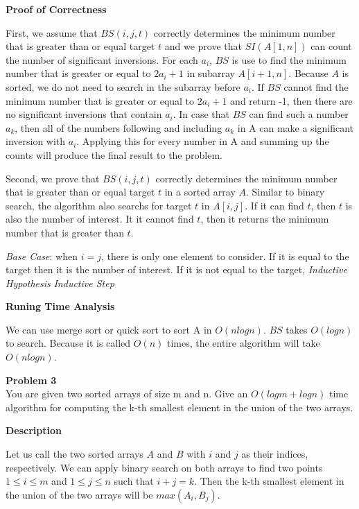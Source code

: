 \documentclass[12pt,article]{article}
\newenvironment{problem}[2][Problem]
    { \begin{mdframed}[backgroundcolor=gray!20] \textbf{#1 #2} \\}
    {  \end{mdframed}}
\begin{document}
\textbf{Proof of Correctness}

First, we assume that $BS(i,j,t)$ correctly determines the minimum number that is greater than or equal target $t$ and we prove that $SI(A[1,n])$ can count the number of significant inversions. For each $a_i$, $BS$ is use to find the minimum number that is greater or equal to $2a_i + 1$ in subarray $A[i+1,n]$. Because $A$ is sorted, we do not need to search in the subarray before $a_i$. If $BS$ cannot find the minimum number that is greater or equal to $2a_i + 1$ and return -1, then there are no significant inversions that contain $a_i$. In case that $BS$ can find such a number $a_k$, then all of the numbers following and including $a_k$ in A can make a significant inversion with $a_i$. Applying this for every number in A and summing up the counts will produce the final result to the problem.

Second, we prove that $BS(i,j,t)$ correctly determines the minimum number that is greater than or equal target $t$ in a sorted array $A$. Similar to binary search, the algorithm also searchs for target $t$ in $A[i,j]$. If it can find $t$, then $t$ is also the number of interest. It it cannot find $t$, then it returns the minimum number that is greater than $t$. 

\textit{Base Case}: when $i = j$, there is only one element to consider. If it is equal to the target then it is the number of interest. If it is not equal to the target, 
\textit{Inductive Hypothesis}
\textit{Inductive Step}

\textbf{Runing Time Analysis}

We can use merge sort or quick sort to sort A in $O(nlogn)$. $BS$ takes $O(logn)$ to search. Because it is called $O(n)$ times, the entire algorithm will take $O(nlogn)$.
\newpage
\begin{problem}{3} 
You are given two sorted arrays of size m and n. Give an $O(logm + logn)$ time algorithm for computing the k-th smallest element in the union of the two arrays.
\end{problem}

\textbf{Description}

Let us call the two sorted arrays $A$ and $B$ with $i$ and $j$ as their indices, respectively. We can apply binary search on both arrays to find two points $1 \leq i \leq m$ and $1 \leq j \leq n$ such that $i + j = k$. Then the k-th smallest element in the union of the two arrays will be $max(A_i,B_j)$.
\end{document}

